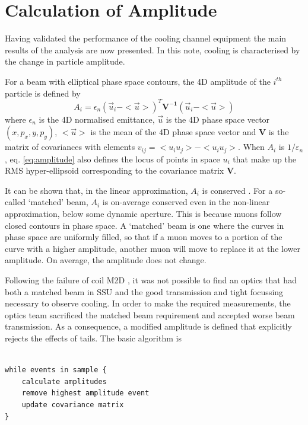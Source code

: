 \section{Calculation of Amplitude}

Having validated the performance of the cooling channel equipment the main 
results of the analysis are now presented. In this note, cooling is 
characterised by the change in particle amplitude.

For a beam with elliptical phase space contours, the 4D amplitude of the 
$i^{th}$ particle is defined by
\begin{equation}
\label{eq:amplitude}
A_i = \epsilon_n (\vec{u}_i - <\vec{u}>)^T \mathbf{V^{-1}} (\vec{u}_i - <\vec{u}>)
\end{equation}
where $\epsilon_n$ is the 4D normalised emittance, $\vec{u}$ is the 4D phase
space vector $(x, p_x, y, p_y)$, $<\vec{u}>$ is the mean of the 4D phase space
vector and $\mathbf{V}$ is the matrix of covariances with elements 
$v_{ij} = <u_i u_j> - <u_i u_j>$. When $A_i$ is $1/\varepsilon_n$, eq. \ref{eq:amplitude}
also defines the locus of points in space $u_i$ that make up the RMS hyper-ellipsoid
corresponding to the covariance matrix $\mathbf{V}$.

It can be shown that, in the linear approximation, $A_i$ is conserved 
\cite{amplitude_conservation}. For a
so-called `matched' beam, $A_i$ is on-average conserved even in the non-linear
approximation, below some dynamic aperture. This is because muons follow closed 
contours in phase space. A `matched' beam is one where the curves in phase space
are uniformly filled, so that if a muon moves to a portion of the curve
with a higher amplitude, another muon will move to replace it at the lower
amplitude. On average, the amplitude does not change.

Following the failure of coil M2D \cite{m2d_failure}, it was not possible to 
find an optics that had both a matched beam in SSU and the good transmission and
tight focussing necessary to observe cooling. In order to make the required
measurements, the optics team sacrificed the matched beam requirement and
accepted worse beam transmission. As a
consequence, a modified amplitude is defined that explicitly rejects the effects
of tails. The basic algorithm is

\begin{minipage}{0.8\textwidth}
\begin{verbatim}

while events in sample {
    calculate amplitudes
    remove highest amplitude event
    update covariance matrix
}

\end{verbatim}
\end{minipage}


